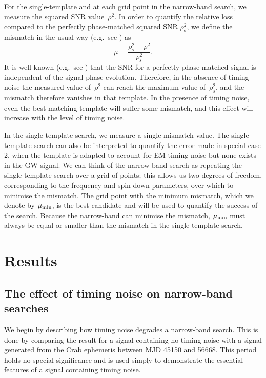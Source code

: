 \documentclass[../full_thesis/full_thesis.tex]{subfiles}
\begin{document}
For the single-template and at each grid point in the narrow-band search, we
measure the squared SNR value~$\rho^{2}$.  In order to quantify the relative
loss compared to the perfectly phase-matched squared SNR
$\rho^{2}_{\mathrm{s}}$, we define the mismatch in the usual way (e.g.\ see
\citet{Prix2007}) as
\begin{equation}
    \mu = \frac{{\rho^{2}_{\mathrm{s}} -
                                  \rho^{2}}}{\rho^{2}_{\mathrm{s}}}.
\label{eqn:mismatch}
\end{equation}
It is well known (e.g.\ see \citet{Prix2009}) that the SNR for a
perfectly phase-matched signal is independent of the signal phase
evolution. Therefore, in the absence of timing
noise the measured value of~$\rho^{2}$ can reach the maximum value
of~$\rho^{2}_{s}$, and the mismatch therefore vanishes in that template.
In the presence of timing noise, even the best-matching template will
suffer some mismatch, and this effect will increase with the level of
timing noise.

In the single-template search, we measure a single mismatch value.  The
single-template search can also be interpreted to quantify the error made in
special case 2, when the template is adapted to account for EM timing noise but
none exists in the GW signal.  We can think of the narrow-band search as
repeating the single-template search over a grid of points; this allows us two
degrees of freedom, corresponding to the frequency and spin-down parameters,
over which to minimise the mismatch. The grid point with the minimum mismatch,
which we denote by $\mu_{\mathrm{min}}$, is the best candidate and will be used to quantify
the success of the search.  Because the narrow-band can minimise the mismatch,
$\mu_{\mathrm{min}}$ must always be equal or smaller than the mismatch in the
single-template search.


\section{Results}
\label{sec: narrow-band results}
\subsection{The effect of timing noise on narrow-band searches} We begin by
describing how timing noise degrades a narrow-band search. This is done by
comparing the result for a signal containing no timing noise with a signal
generated from the Crab ephemeris between MJD 45150 and 56668. This period
holds no special significance and is used simply to demonstrate the essential
features of a signal containing timing noise.
\end{document}
